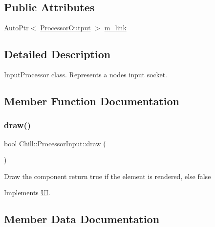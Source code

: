 \subsection*{Public Attributes}
\begin{DoxyCompactItemize}
\item 
Auto\+Ptr$<$ \mbox{\hyperlink{class_chill_1_1_processor_output}{Processor\+Output}} $>$ \mbox{\hyperlink{class_chill_1_1_processor_input_ab1e5cd5d0f3b9b12c3245488237177a1}{m\+\_\+link}}
\end{DoxyCompactItemize}


\subsection{Detailed Description}
Input\+Processor class. Represents a node\textquotesingle{}s input socket. 

\subsection{Member Function Documentation}
\mbox{\label{class_chill_1_1_processor_input_a0dfb7b669e95248d3a5974b7800aeb66}} 
\subsubsection{\texorpdfstring{draw()}{draw()}}
{\footnotesize\ttfamily bool Chill\+::\+Processor\+Input\+::draw (\begin{DoxyParamCaption}{ }\end{DoxyParamCaption})\hspace{0.3cm}{\ttfamily [virtual]}}

Draw the component return true if the element is rendered, else false 

Implements \mbox{\hyperlink{class_u_i_a5025b88e26f21852c0cd2e4b42675c50}{UI}}.



\subsection{Member Data Documentation}
\mbox{\label{class_chill_1_1_processor_input_ab1e5cd5d0f3b9b12c3245488237177a1}} 
